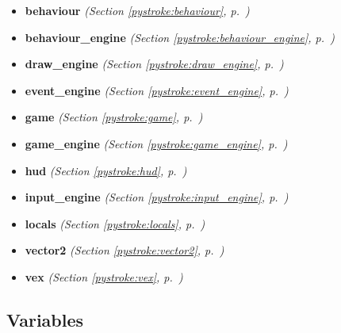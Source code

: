 \begin{itemize}
\setlength{\parskip}{0ex}
\item \textbf{behaviour}
  \textit{(Section \ref{pystroke:behaviour}, p.~\pageref{pystroke:behaviour})}

\item \textbf{behaviour\_engine}
  \textit{(Section \ref{pystroke:behaviour_engine}, p.~\pageref{pystroke:behaviour_engine})}

\item \textbf{draw\_engine}
  \textit{(Section \ref{pystroke:draw_engine}, p.~\pageref{pystroke:draw_engine})}

\item \textbf{event\_engine}
  \textit{(Section \ref{pystroke:event_engine}, p.~\pageref{pystroke:event_engine})}

\item \textbf{game}
  \textit{(Section \ref{pystroke:game}, p.~\pageref{pystroke:game})}

\item \textbf{game\_engine}
  \textit{(Section \ref{pystroke:game_engine}, p.~\pageref{pystroke:game_engine})}

\item \textbf{hud}
  \textit{(Section \ref{pystroke:hud}, p.~\pageref{pystroke:hud})}

\item \textbf{input\_engine}
  \textit{(Section \ref{pystroke:input_engine}, p.~\pageref{pystroke:input_engine})}

\item \textbf{locals}
  \textit{(Section \ref{pystroke:locals}, p.~\pageref{pystroke:locals})}

\item \textbf{vector2}
  \textit{(Section \ref{pystroke:vector2}, p.~\pageref{pystroke:vector2})}

\item \textbf{vex}
  \textit{(Section \ref{pystroke:vex}, p.~\pageref{pystroke:vex})}

\end{itemize}



  \subsection{Variables}

